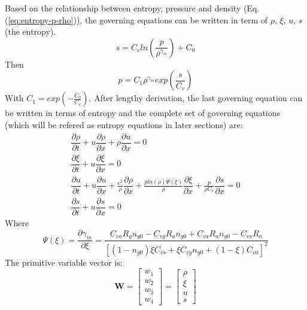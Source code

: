 Based on the relationship between entropy, pressure and density (Eq. (\ref{eq:entropy-p-rho})), the governing equations can be written in term of $\rho	$, $\xi$, $u$, $s$ (the entropy).
\begin{equation}
s=C_v ln(\dfrac{p}{\rho^{\gamma_m}})+C_0 \label{eq:entropy-p-rho}
\end{equation}
Then
\begin{equation}
p=C_1 \rho^{\gamma_m} exp(\frac{s}{C_v})
\end{equation}
With $C_1=exp(-\frac{C_0}{C_v})$.
After lengthy derivation, the last governing equation can be written in terms of entropy and the complete set of governing equations (which will be refered as entropy equations in later sections) are: 
\begin{eqnarray}
\dfrac{\partial \rho}{\partial t} + u \dfrac{\partial \rho} {\partial x} + \rho \dfrac{\partial u} {\partial x}= 0 \label{eq:gov-EntropyForm-rho-1d-hom} \\
\dfrac{\partial \xi}{\partial t} + u \dfrac{\partial \xi} {\partial x}= 0 \label{eq:gov-EntropyForm-ks-1d-hom}\\
\dfrac{\partial u}{\partial t} + u \dfrac{\partial u} {\partial x} + \frac{c^2}{\rho} \dfrac{\partial \rho} {\partial x} + \frac{p ln(\rho) \Psi(\xi)}{\rho} \dfrac{\partial \xi} {\partial x} + \frac{p}{\rho C_v} \dfrac{\partial s} {\partial x} = 0 \label{eq:gov-EntropyForm-v-1d-hom} \\
\dfrac{\partial s}{\partial t} + u \dfrac{\partial s} {\partial x}= 0 \label{eq:gov-EntropyForm-e-1d-hom}
\end{eqnarray}
Where
\begin{equation}
\Psi(\xi) = \dfrac{\partial \gamma_m}{ \partial \xi}
= \frac{C_{va}R_g n_{g0} - C_{vg}R_a n_{g0} + C_{vs}R_a n_{g0} - C_{vs} R_a}{\left[(1-n_{g0}) \xi C_{vs} + \xi C_{vg} n_{g0}+(1-\xi)C_{va}\right]^2}
\end{equation}
The primitive variable vector is:
\begin{equation}
   \textbf{W}=\begin{bmatrix}
         w_1 \\
         w_2 \\
         w_3 \\
         w_4
     \end{bmatrix}
    =\begin{bmatrix}
         \rho \\
         \xi \\
         u   \\
         s
     \end{bmatrix}
\end{equation}
